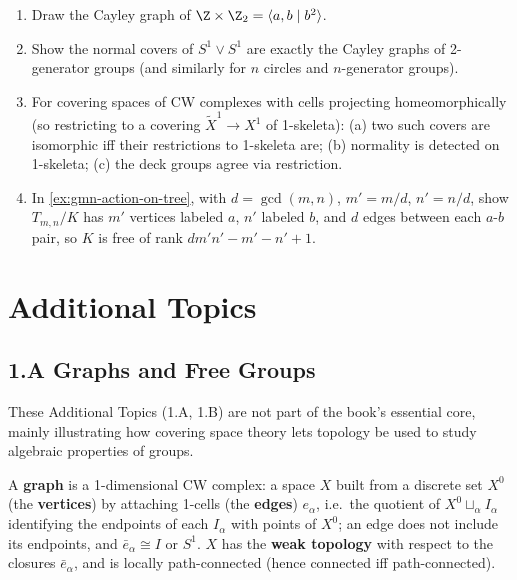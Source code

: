\begin{enumerate}
\item Draw the Cayley graph of $\Z\times\Z_2 = \langle a,b\mid b^2\rangle$.

\item Show the normal covers of $S^1\vee S^1$ are exactly the Cayley graphs of
2-generator groups (and similarly for $n$ circles and $n$-generator groups).

\item For covering spaces of CW complexes with cells projecting homeomorphically
(so restricting to a covering $\tilde X^1\to X^1$ of 1-skeleta): (a) two such covers
are isomorphic iff their restrictions to 1-skeleta are; (b) normality is detected on
1-skeleta; (c) the deck groups agree via restriction.

\item In \cref{ex:gmn-action-on-tree}, with $d=\gcd(m,n)$, $m'=m/d$, $n'=n/d$,
show $T_{m,n}/K$ has $m'$ vertices labeled $a$, $n'$ labeled $b$, and $d$ edges
between each $a$-$b$ pair, so $K$ is free of rank $dm'n'-m'-n'+1$.
\end{enumerate}

\section*{Additional Topics}
\subsection{1.A Graphs and Free Groups}
\label{sec:graphs-and-free-groups}

These Additional Topics (1.A, 1.B) are not part of the book's essential core, mainly
illustrating how covering space theory lets topology be used to study algebraic
properties of groups.

\begin{definition}
\label{def:graph}
A \textbf{graph} is a 1-dimensional CW complex: a space $X$ built from a discrete
set $X^0$ (the \textbf{vertices}) by attaching 1-cells (the \textbf{edges}) $e_\alpha$, i.e.\ the quotient
of $X^0 \sqcup_\alpha I_\alpha$ identifying the endpoints of each $I_\alpha$ with points of $X^0$; an
edge does not include its endpoints, and $\bar e_\alpha \cong I$ or $S^1$. $X$ has the
\textbf{weak topology} with respect to the closures $\bar e_\alpha$, and is locally path-connected
(hence connected iff path-connected).
\end{definition}


